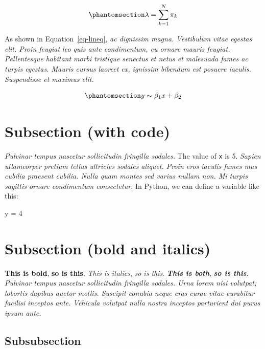 \documentclass[
  10pt,
  a4paper,
]{scrbook}
\newenvironment{Shaded}{\begin{snugshade}}{\end{snugshade}}
\newcommand{\DecValTok}[1]{\textcolor[rgb]{0.69,0.50,0.00}{#1}}
\newcommand{\NormalTok}[1]{\textcolor[rgb]{0.12,0.11,0.11}{#1}}
\newcommand{\OperatorTok}[1]{\textcolor[rgb]{0.12,0.11,0.11}{#1}}
\let\oldemph\emph
\renewcommand\emph[1]{\oldemph{\color{gray}#1}} %
\renewenvironment{Shaded}
{
  \vspace{-0.5em} %
  \begin{snugshade} %
  \small %
}
{
  \end{snugshade} %
  \vspace{-1em} %
}
\begin{document}
\begin{equation}\phantomsection\label{eq-stat}{
\lambda = \sum_{k=1}^N \pi_k
}\end{equation}

As shown in Equation~\ref{eq-lineq}, \emph{ac dignissim magna.
Vestibulum vitae egestas elit. Proin feugiat leo quis ante condimentum,
eu ornare mauris feugiat. Pellentesque habitant morbi tristique senectus
et netus et malesuada fames ac turpis egestas. Mauris cursus laoreet ex,
ignissim bibendum est posuere iaculis. Suspendisse et maximus elit.}

\begin{equation}\phantomsection\label{eq-lineq}{
y \sim \beta_1 x + \beta_2
}\end{equation}

\section{Subsection (with code)}\label{subsection-with-code}

\emph{Pulvinar tempus nascetur sollicitudin fringilla sodales.} The
value of \texttt{x} is 5. \emph{Sapien ullamcorper pretium tellus
ultricies sodales aliquet. Proin eros iaculis fames mus cubilia praesent
cubilia. Nulla quam montes sed varius nullam non. Mi turpis sagittis
ornare condimentum consectetur.} In Python, we can define a variable
like this:

\begin{Shaded}
\begin{Highlighting}[]
\NormalTok{y }\OperatorTok{=} \DecValTok{4}
\end{Highlighting}
\end{Shaded}

\section{Subsection (bold and
italics)}\label{subsection-bold-and-italics}

\textbf{This is bold}, \textbf{so is this}. \emph{This is italics},
\emph{so is this}. \textbf{\emph{This is both}}, \textbf{\emph{so is
this}}. \emph{Pulvinar tempus nascetur sollicitudin fringilla sodales.
Urna lorem nisi volutpat; lobortis dapibus auctor mollis. Suscipit
conubia neque cras curae vitae curabitur facilisi inceptos ante.
Vehicula volutpat nulla nostra inceptos parturient dui purus ipsum
ante.}

\subsection{Subsubsection}\label{subsubsection}
\end{document}
